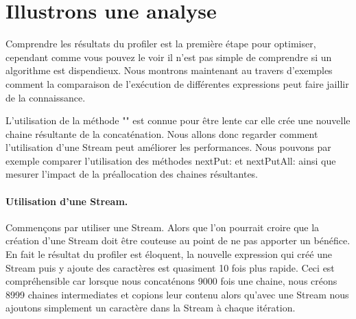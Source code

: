 \documentclass[a4paper,10pt,twoside]{book}
\begin{document}
\section{Illustrons une analyse}
Comprendre les r\'esultats du profiler est la premi\`ere \'etape pour
optimiser, cependant comme vous pouvez le voir il n'est pas simple de
comprendre si un algorithme est dispendieux. Nous montrons maintenant
au travers d'exemples comment la comparaison de l'ex\'ecution de
diff\'erentes expressions peut faire jaillir de la connaissance.



L'utilisation de la m\'ethode "\ct{,}" est connue pour \^etre lente car
elle cr\'ee une nouvelle chaine r\'esultante de la
concat\'enation. Nous allons donc regarder comment l'utilisation d'une
Stream peut am\'eliorer les performances. Nous pouvons par exemple
comparer l'utilisation des m\'ethodes nextPut: et nextPutAll: ainsi
que mesurer l'impact de la pr\'eallocation des chaines r\'esultantes. 

\paragraph{Utilisation d'une Stream.}
Commen\c cons par utiliser une Stream. Alors que l'on pourrait croire
que la cr\'eation d'une Stream doit \^etre couteuse au point de ne pas
apporter un b\'en\'efice. En fait le r\'esultat du profiler est
\'eloquent, la nouvelle expression qui cr\'e\'e une Stream puis y
ajoute des caract\`eres est quasiment 10 fois plus rapide. Ceci est
compr\'ehensible car lorsque nous concat\'enons 9000 fois une chaine,
nous cr\'eons 8999 chaines intermediates et copions leur contenu alors
qu'avec une Stream nous ajoutons simplement un caract\`ere dans la
Stream \`a chaque it\'eration. 
\end{document}
